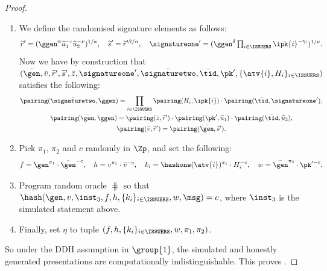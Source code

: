 \begin{proof}
\begin{enumerate}
    \item We define the randomised signature elements as follows:
%
      \begin{equation*}
%
	\widetilde{r}' =
(\ggen^\alpha\widetilde{u}_1^{-\iota}\widetilde{u}_2^{-\nu})^{1/\kappa}, \quad
\widetilde{s}' = \widetilde{r}'^{\beta/\alpha}, \quad \signatureone' =
(\ggen^{\delta}\textstyle\prod_{i \in \ISSUERS}\ipk{i}^{-\eta_i})^{1/\nu}.
%
      \end{equation*}
%
      Now we have by construction that $(\bar{\gen}, \bar{v}, \widetilde{r}',
\widetilde{s}', \bar{z}, \signatureone', \bar{\signaturetwo}, \bar{\tid}, \pk',
\{\atv{i}, H_i\}_{i\in \ISSUERS})$ satisfies the following:
      \begin{gather*}
	\pairing(\bar{\signaturetwo}, \ggen) =
\prod_{i\in\ISSUERS}\pairing(H_i,\ipk{i}) \cdot
\pairing(\bar{\tid},\signatureone'), \\
	\pairing(\bar{\gen},\ggen) = \pairing(\bar{z},\widetilde{r}')\cdot
\pairing(\pk',\widetilde{u}_1) \cdot \pairing(\bar{\tid},\widetilde{u}_2), \\
	\pairing(\bar{v},\widetilde{r}') = \pairing(\bar{\gen},\widetilde{s}').
      \end{gather*}

    \item Pick $\pi_1$, $\pi_2$ and $c$ randomly in $\Zp$, and set the
following:
%
      \begin{equation*}
%
	f = \gen^{\pi_1}\cdot\bar{\gen}^{-c}, \quad h =
v^{\pi_1}\cdot\bar{v}^{-c}, \quad k_i = \hashone(\atv{i})^{\pi_1}\cdot H_i^{-c},
\quad w = \bar{\gen}^{\pi_2}\cdot\pk'^{-c}.
%
      \end{equation*}

        \item Program random oracle $\hash$ so that $\hash(\gen, v, \inst_3, f, h,
\{k_i\}_{i \in \ISSUERS}, w, \msg) = c$, where $\inst_3$ is the simulated
statement above.

    \item Finally, set $\eta$ to tuple $(f, h, \{k_i\}_{i \in \ISSUERS}, w,
\pi_1, \pi_2)$.

  \end{enumerate}

  So under the DDH assumption in $\group{1}$, the simulated and honestly
generated presentations are computationally indistinguishable. This proves
.

\end{proof}

